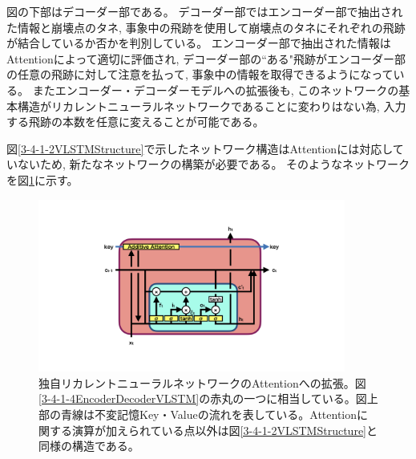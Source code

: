図の下部はデコーダー部である。
デコーダー部ではエンコーダー部で抽出された情報と崩壊点のタネ, 事象中の飛跡を使用して崩壊点のタネにそれぞれの飛跡が結合しているか否かを判別している。
エンコーダー部で抽出された情報はAttentionによって適切に評価され, デコーダー部の``ある"飛跡がエンコーダー部の任意の飛跡に対して注意を払って, 事象中の情報を取得できるようになっている。
またエンコーダー・デコーダーモデルへの拡張後も, このネットワークの基本構造がリカレントニューラルネットワークであることに変わりはない為, 入力する飛跡の本数を任意に変えることが可能である。

図\ref{3-4-1-2VLSTMStructure}で示したネットワーク構造はAttentionには対応していないため, 新たなネットワークの構築が必要である。
そのようなネットワークを図\ref{3-4-1-5AttentionVLSTM}に示す。

\begin{figure}[htbp]
 \centering
 \includegraphics[trim = 100 0 100 0, width=0.9\textwidth, clip]{Figure/3Networks/3-4-1-5AttentionVLSTM.png}
 \caption[独自リカレントニューラルネットワークのAttentionへの拡張]{独自リカレントニューラルネットワークのAttentionへの拡張。図\ref{3-4-1-4EncoderDecoderVLSTM}の赤丸の一つに相当している。図上部の青線は不変記憶Key・Valueの流れを表している。Attentionに関する演算が加えられている点以外は図\ref{3-4-1-2VLSTMStructure}と同様の構造である。}
 \label{3-4-1-5AttentionVLSTM}
\end{figure}

